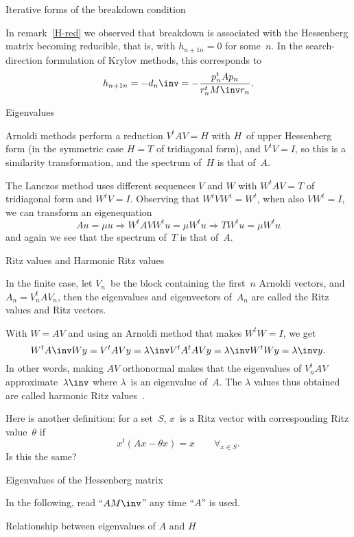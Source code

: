 \documentclass[11pt]{artikel3}
\begin{document}
\begin{Outline}
\begin{comment}
\end{comment}

 {Iterative forms of the breakdown condition}

In remark~\ref{H-red} we observed that breakdown
is associated with the Hessenberg matrix becoming reducible,
that is, with $h_{n+1n}=0$ for some~$n$.
In the search-direction formulation of Krylov methods,
this corresponds to
\[ h_{n+1n}=-d_n\inv=-{p_n^tAp_n\over r_n^tM\inv r_n}. \]


 {Eigenvalues}

Arnoldi methods perform a reduction $V^tAV=H$ with $H$~of upper
Hessenberg form (in the symmetric case $H=T$ of tridiagonal form),
and $V^tV=I$, so this
is a similarity transformation, and the spectrum of~$H$ is that
of~$A$.

The Lanczos method uses different sequences $V$ and $W$ with $W^tAV=T$
of tridiagonal form and $W^tV=I$. Observing that $W^tVW^t=W^t$, when
also $VW^t=I$, we can transform an eigenequation
\[ Au = \mu u \Rightarrow W^tAVW^t u = \mu W^tu \Rightarrow
    TW^tu=\mu W^tu \]
and again we see that the spectrum of~$T$ is that of~$A$.

 {Ritz values and Harmonic Ritz values}

In the finite case, let $V_n$~be the block containing the first~$n$
Arnoldi vectors, and $A_n=V_n^tAV_n$, then the eigenvalues and
eigenvectors of~$A_n$ are called the Ritz values
and Ritz vectors.

With $W=AV$ and using an Arnoldi method that makes $W^tW=I$, we get
\[ W^tA\inv Wy=V^tAVy=\lambda\inv V^tA^tAVy=\lambda\inv
W^tWy=\lambda\inv y. \] In other words, making $AV$ orthonormal makes
that the eigenvalues of $V_n^tAV$ approximate~$\lambda\inv$ where
$\lambda$~is an eigenvalue of~$A$. The $\lambda$ values thus obtained
are called harmonic Ritz
values~\cite{PagParVdV:approx,Mor:interior,Fr:cgcomplexsymmetric}.

\begin{question}
Here is another definition: for a set~$S$, $x$~is a Ritz vector with
corresponding Ritz value~$\theta$ if 
\[ x^t(Ax-\theta x)=x\qquad\forall_{x\in S}. \]
Is this the same?
\end{question}

 {Eigenvalues of the Hessenberg matrix}

In the following, read ``$AM\inv$'' any time ``$A$'' is used.

 {Relationship between eigenvalues of $A$ and $H$}


\end{Outline}
\end{document}
